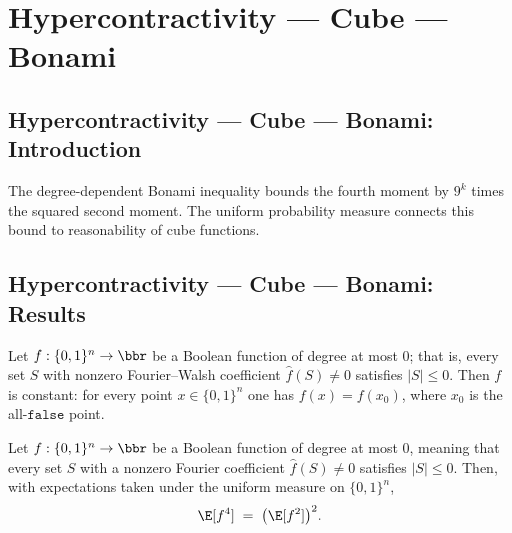 \section{Hypercontractivity --- Cube --- Bonami}
\subsection*{Hypercontractivity --- Cube --- Bonami: Introduction}
The degree-dependent Bonami inequality bounds the fourth moment by $9^k$ times the squared second moment. The uniform probability measure connects this bound to reasonability of cube functions.

\subsection*{Hypercontractivity --- Cube --- Bonami: Results}

\begin{lemma}
\leanok
{}
\label{BooleanAnalysis.Hypercontractivity.degree_zero_const}
Let $f:\{0,1\}^n\to\bbr$ be a Boolean function of degree at most $0$; that is, every set
$S$ with nonzero Fourier--Walsh coefficient $\hat f(S)\ne 0$ satisfies $|S|\le 0$. Then
$f$ is constant: for every point $x\in\{0,1\}^n$ one has $f(x)=f(x_0)$, where $x_0$ is
the all-$\mathtt{false}$ point.
\end{lemma}

\begin{lemma}
\leanok
{}
\label{BooleanAnalysis.Hypercontractivity.degree_zero_fourth_moment}
Let $f:\{0,1\}^n\to\bbr$ be a Boolean function of degree at most $0$, meaning that every
set $S$ with a nonzero Fourier coefficient $\hat f(S)\ne 0$ satisfies $|S|\le 0$. Then,
with expectations taken under the uniform measure on $\{0,1\}^n$,
\[
  \E[f^4] \;=\; \bigl(\E[f^2]\bigr)^2.
\]
\end{lemma}

